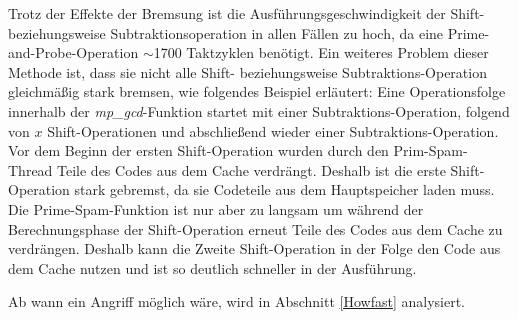 Trotz der Effekte der Bremsung ist die Ausführungsgeschwindigkeit der Shift- beziehungsweise Subtraktionsoperation in allen Fällen zu hoch, da eine Prime-and-Probe-Operation $\sim$1700 Taktzyklen benötigt.
Ein weiteres Problem dieser Methode ist, dass sie nicht alle Shift- beziehungsweise Subtraktions-Operation gleichmäßig stark bremsen, wie folgendes Beispiel erläutert:
Eine Operationsfolge innerhalb der \textit{mp_gcd}-Funktion startet mit einer Subtraktions-Operation, folgend von $x$ Shift-Operationen und abschließend wieder einer Subtraktions-Operation.
Vor dem Beginn der ersten Shift-Operation wurden durch den Prim-Spam-Thread Teile des Codes aus dem Cache verdrängt.
Deshalb ist die erste Shift-Operation stark gebremst, da sie Codeteile aus dem Hauptspeicher laden muss. 
Die Prime-Spam-Funktion ist nur aber zu langsam um während der Berechnungsphase der Shift-Operation erneut Teile des Codes aus dem Cache zu verdrängen.
Deshalb kann die Zweite Shift-Operation in der Folge den Code aus dem Cache nutzen und ist so deutlich schneller in der Ausführung.

Ab wann ein Angriff möglich wäre, wird in Abschnitt \ref{Howfast} analysiert.










